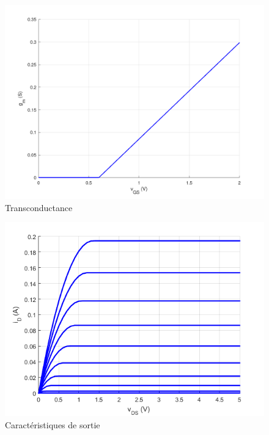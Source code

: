 \documentclass{../template/labo}
\begin{document}
\begin{figure}[H]
	\centering
	\includegraphics[width=.8\textwidth]{gm_vGS.png}
	\caption{Transconductance}
\end{figure}

\begin{figure}[H]
	\centering
	\includegraphics[width=.8\textwidth]{iD_vDS.png}
	\caption{Caractéristiques de sortie}
\end{figure}

\clearpage
\end{document}
